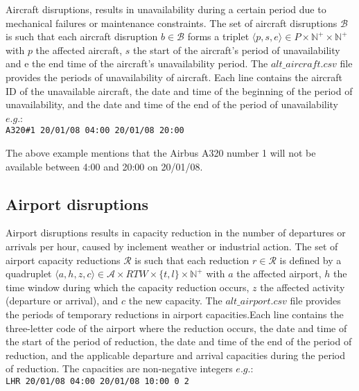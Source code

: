 \documentclass[ijoo,nonblindrev]{informs-ijoo}
\begin{document}
	Aircraft disruptions, results in unavailability during a certain period due to mechanical failures or maintenance constraints. The set of aircraft disruptions $\mathcal{B}$ is such that each aircraft disruption $b \in \mathcal{B}$ forms a triplet $\langle p, s, e \rangle  \in P \times \mathbb{N}^{+} \times \mathbb{N}^{+}$ with $p$ the affected aircraft, $s$ the start of the aircraft's period of unavailability and e the end time of the aircraft's unavailability period.
	The $alt\_aircraft.csv$ file provides the periods of unavailability of aircraft. Each line contains the aircraft ID of the unavailable aircraft, the date and 	time  of the beginning of the period of unavailability, and the date and time of the end of the period of unavailability $e.g.$:\\
	\newline
	{\texttt{\footnotesize A320\#1 20/01/08 04:00 20/01/08 20:00}}
	\newline
	
	The above example mentions that the Airbus A320 number 1 will not be available between 4:00 and 20:00 on 20/01/08.
	
\subsection{Airport disruptions} \label{subsec:airportDisr}
Airport disruptions results in capacity reduction in the number of departures or arrivals per hour, caused by inclement weather or industrial action. The set of airport capacity reductions $\mathcal{R}$ is such that each reduction $ r \in \mathcal{R}$ is defined by a quadruplet $\langle a, h, z, c\rangle \in \mathcal{A} \times RTW \times {\{t, l\}} \times \mathbb{N}^{+}$  with $a$ the affected airport, $h$ the time window during which the capacity reduction occurs, $z$ the affected activity (departure or arrival), and $c$ the new capacity. 
	The $alt\_airport.csv$ file provides the periods of temporary reductions in airport capacities.Each line contains the three-letter code of the airport where the reduction occurs, the date and time of the start of the period of reduction, the date and time of the end of the period of reduction, and the applicable departure and arrival 	capacities during the period of reduction. The capacities are non-negative integers $e.g.$:\\
	\newline
	{\texttt{\footnotesize LHR 20/01/08 04:00 20/01/08 10:00 0 2}}
	\newline
	
\end{document}

